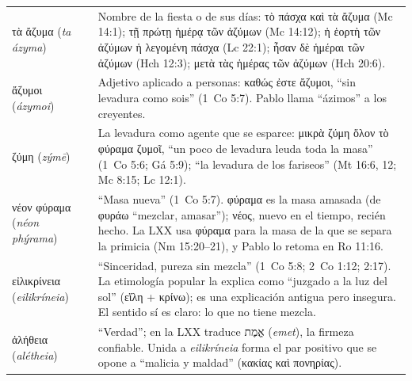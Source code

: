 \documentclass[11pt,letterpaper]{article}
\newcommand{\heb}[1]{\mbox{\foreignlanguage{hebrew}{#1}}}
\newcommand{\grc}[1]{\foreignlanguage{ancientgreek}{#1}}
\begin{document}
\begin{filologia}
\begin{tabular}{@{}L{3.6cm}L{11.4cm}@{}}
\grc{τὰ ἄζυμα} (\emph{ta ázyma}) & Nombre de la fiesta o de sus días: \grc{τὸ πάσχα καὶ τὰ ἄζυμα} (Mc 14:1); \grc{τῇ πρώτῃ ἡμέρᾳ τῶν ἀζύμων} (Mc 14:12); \grc{ἡ ἑορτὴ τῶν ἀζύμων ἡ λεγομένη πάσχα} (Lc 22:1); \grc{ἦσαν δὲ ἡμέραι τῶν ἀζύμων} (Hch 12:3); \grc{μετὰ τὰς ἡμέρας τῶν ἀζύμων} (Hch 20:6). \\[2pt]
\grc{ἄζυμοι} (\emph{ázymoi}) & Adjetivo aplicado a personas: \grc{καθώς ἐστε ἄζυμοι}, ``sin levadura como sois'' (1~Co 5:7). Pablo llama ``ázimos'' a los creyentes. \\[2pt]
\grc{ζύμη} (\emph{zýmē}) & La levadura como agente que se esparce: \grc{μικρὰ ζύμη ὅλον τὸ φύραμα ζυμοῖ}, ``un poco de levadura leuda toda la masa'' (1~Co 5:6; Gá 5:9); ``la levadura de los fariseos'' (Mt 16:6, 12; Mc 8:15; Lc 12:1). \\[2pt]
\grc{νέον φύραμα} (\emph{néon phýrama}) & ``Masa nueva'' (1~Co 5:7). \grc{φύραμα} es la masa amasada (de \grc{φυράω} ``mezclar, amasar''); \grc{νέος}, nuevo en el tiempo, recién hecho. La LXX usa \grc{φύραμα} para la masa de la que se separa la primicia (Nm 15:20--21), y Pablo lo retoma en Ro 11:16. \\[2pt]
\grc{εἰλικρίνεια} (\emph{eilikríneia}) & ``Sinceridad, pureza sin mezcla'' (1~Co 5:8; 2~Co 1:12; 2:17). La etimología popular la explica como ``juzgado a la luz del sol'' (\grc{εἵλη} + \grc{κρίνω}); es una explicación antigua pero insegura. El sentido sí es claro: lo que no tiene mezcla. \\[2pt]
\grc{ἀλήθεια} (\emph{alétheia}) & ``Verdad''; en la LXX traduce \heb{אֱמֶת} (\emph{emet}), la firmeza confiable. Unida a \emph{eilikríneia} forma el par positivo que se opone a ``malicia y maldad'' (\grc{κακίας καὶ πονηρίας}). \\
\end{tabular}
\end{filologia}
\end{document}
